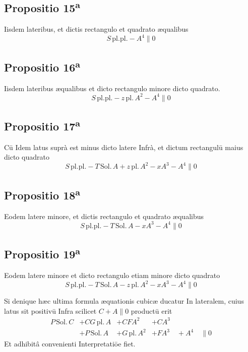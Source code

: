 \documentclass[11pt,a4paper]{article}
\begin{document}
\subsection*{Propositio 15\textsuperscript{a}}

Iisdem lateribus, et dictis rectangulo et quadrato æqualibus
\[ S\,\mathrm{pl.pl.} - A^{4} \parallel 0 \]

\subsection*{Propositio 16\textsuperscript{a}}

Iisdem lateribus æqualibus et dicto rectangulo minore dicto quadrato.
\[ S\,\mathrm{pl.pl.} - z\,\mathrm{pl.}\,A^{2} - A^{4} \parallel 0 \]

\subsection*{Propositio 17\textsuperscript{a}}

Cū Idem latus suprà est minus dicto latere Infrà, et dictum rectangulū maius dicto quadrato
\[ S\,\mathrm{pl.pl.} - T\,\mathrm{Sol.}\,A + z\,\mathrm{pl.}\,A^{2} - xA^{3} - A^{4} \parallel 0 \]

\subsection*{Propositio 18\textsuperscript{a}}

Eodem latere minore, et dictis rectangulo et quadrato æqualibus
\[ S\,\mathrm{pl.pl.} - T\,\mathrm{Sol.}\,A - xA^{3} - A^{4} \parallel 0 \]

\subsection*{Propositio 19\textsuperscript{a}}

Eodem latere minore et dicto rectangulo etiam minore dicto quadrato
\[ S\,\mathrm{pl.pl.} - T\,\mathrm{Sol.}\,A - z\,\mathrm{pl.}\,A^{2} - xA^{3} - A^{4} \parallel 0 \]

Si denique hæc ultima formula æquationis cubicæ ducatur In lateralem, cuius latus sit positivū Infra scilicet $C + A \parallel 0$ productū erit
\[ \begin{array}{llll} P\,\mathrm{Sol.}\,C & + CG\,\mathrm{pl.}\,A & + CFA^{2} & + CA^{3} \\ & + P\,\mathrm{Sol.}\,A & + G\,\mathrm{pl.}\,A^{2} & + FA^{3} \quad + A^{4} \quad \parallel 0 \end{array} \]
Et adhibitâ convenienti Interpretatiōe fiet.
\end{document}
